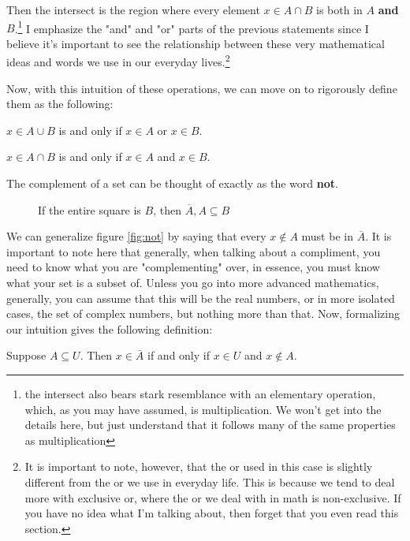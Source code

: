 Then the intersect is the region where every element $x\in A\cap B$ is both in $A$ \textbf{and} $B$.\footnote{the intersect also bears stark resemblance with an elementary operation, which, as you may have assumed, is multiplication. 
We won't get into the details here, but just understand that it follows many of the same properties as multiplication}
I emphasize the "and" and "or" parts of the previous statements since I believe it's important to see the relationship between these very mathematical ideas and words we use in our everyday lives.\footnote{
It is important to note, however, that the or used in this case is slightly different from the or we use in everyday life.
This is because we tend to deal more with exclusive or, where the or we deal with in math is non-exclusive. 
If you have no idea what I'm talking about, then forget that you even read this section.}

Now, with this intuition of these operations, we can move on to rigorously define them as the following:
\begin{define}
$x\in A\cup B$ is and only if $x\in A$ or $x\in B$.	
\end{define}
\begin{define}
$x\in A\cap B$ is and only if $x\in A$ and $x\in B$.	
\end{define}

The complement of a set can be thought of exactly as the word \textbf{not}.
\begin{figure}[h]
\centering
	\caption{If the entire square is $B$, then $\overline A, A\subseteq B$}
	\label{fig:not}
\end{figure}
We can generalize figure \eqref{fig:not} by saying that every $x\notin  A$ must be in $\overline A$.
It is important to note here that generally, when talking about a compliment, you need to know what you are "complementing" over, in essence, you must know what your set is a subset of.
Unless you go into more advanced mathematics, generally, you can assume that this will be the real numbers, or in more isolated cases, the set of complex numbers, but nothing more than that.
Now, formalizing our intuition gives the following definition:
\begin{define}
	Suppose $A\subseteq U$. Then $x\in \bar A$ if and only if $x\in U$ and $x\notin A$.\footnotemark
\end{define}

